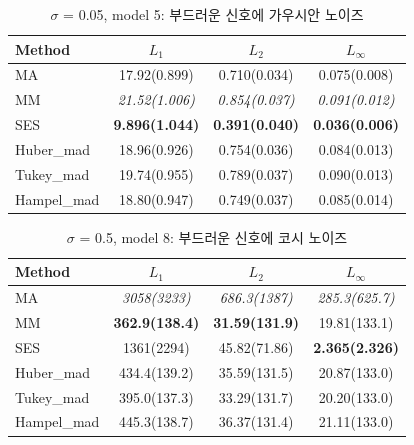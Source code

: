 \documentclass[letterpaper,12pt]{article}
\begin{document}
{%
\begin{table}[H]
\small
\centering
\caption{$\sigma$ = 0.05, model 5: 부드러운 신호에 가우시안 노이즈}
\label{tab:s5w5m5}
\begin{tabular}{lccc}
\toprule
Method         & $L_1$             & $L_2$             & $L_\infty$         \\
\midrule
MA             & 17.92(0.899)          & 0.710(0.034)          & 0.075(0.008)           \\
MM             & \textit{21.52(1.006)} & \textit{0.854(0.037)} & \textit{0.091(0.012)}  \\
SES            & \textbf{9.896(1.044)} & \textbf{0.391(0.040)} & \textbf{0.036(0.006)}  \\
Huber\_mad     & 18.96(0.926)          & 0.754(0.036)          & 0.084(0.013)           \\
Tukey\_mad     & 19.74(0.955)          & 0.789(0.037)          & 0.090(0.013)           \\
Hampel\_mad    & 18.80(0.947)          & 0.749(0.037)          & 0.085(0.014)           \\
\bottomrule
\end{tabular}
\end{table}

\begin{table}[H]
\small
\centering
\caption{$\sigma$ = 0.5, model 8: 부드러운 신호에 코시 노이즈}
\label{tab:s50w5m8}
\begin{tabular}{lccc}
\toprule
Method         & $L_1$             & $L_2$             & $L_\infty$         \\
\midrule
MA             & \textit{3058(3233)}   & \textit{686.3(1387)}  & \textit{285.3(625.7)}  \\
MM             & \textbf{362.9(138.4)} & \textbf{31.59(131.9)} & 19.81(133.1)           \\
SES            & 1361(2294)            & 45.82(71.86)          & \textbf{2.365(2.326)}  \\
Huber\_mad     & 434.4(139.2)          & 35.59(131.5)          & 20.87(133.0)           \\
Tukey\_mad     & 395.0(137.3)          & 33.29(131.7)          & 20.20(133.0)           \\
Hampel\_mad    & 445.3(138.7)          & 36.37(131.4)          & 21.11(133.0)           \\
\bottomrule
\end{tabular}
\end{table}


}
\end{document}
